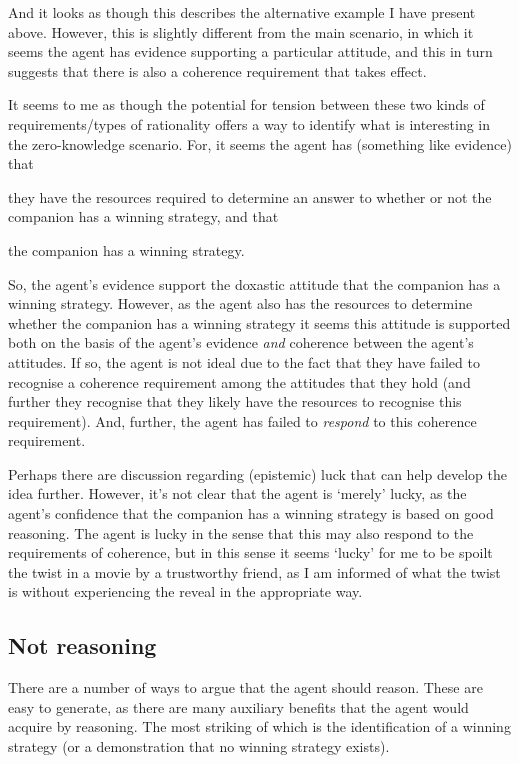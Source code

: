 \documentclass[10pt]{article}
\begin{document}
And it looks as though this describes the alternative example I have present above.
However, this is slightly different from the main scenario, in which it seems the agent has evidence supporting a particular attitude, and this in turn suggests that there is also a coherence requirement that takes effect.

It seems to me as though the potential for tension between these two kinds of requirements/types of rationality offers a way to identify what is interesting in the zero-knowledge scenario.
For, it seems the agent has (something like evidence) that
\begin{enumerate*}
\item they have the resources required to determine an answer to whether or not the companion has a winning strategy, and that
\item the companion has a winning strategy.
\end{enumerate*}
So, the agent's evidence support the doxastic attitude that the companion has a winning strategy.
However, as the agent also has the resources to determine whether the companion has a winning strategy it seems this attitude is supported both on the basis of the agent's evidence \emph{and} coherence between the agent's attitudes.
If so, the agent is not ideal due to the fact that they have failed to recognise a coherence requirement among the attitudes that they hold (and further they recognise that they likely have the resources to recognise this requirement).
And, further, the agent has failed to \emph{respond} to this coherence requirement.

Perhaps there are discussion regarding (epistemic) luck that can help develop the idea further.
However, it's not clear that the agent is `merely' lucky, as the agent's confidence that the companion has a winning strategy is based on good reasoning.
The agent is lucky in the sense that this may also respond to the requirements of coherence, but in this sense it seems `lucky' for me to be spoilt the twist in a movie by a trustworthy friend, as I am informed of what the twist is without experiencing the reveal in the appropriate way.

\subsection{Not reasoning}
\label{sec:not-reasoning}

There are a number of ways to argue that the agent should reason.
These are easy to generate, as there are many auxiliary benefits that the agent would acquire by reasoning.
The most striking of which is the identification of a winning strategy (or a demonstration that no winning strategy exists).
\end{document}
